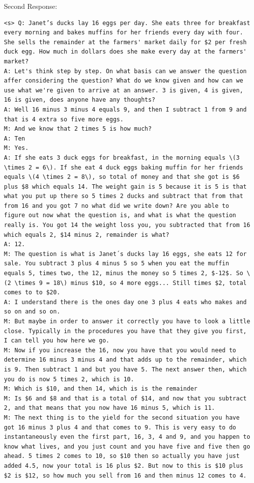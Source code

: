 \documentclass{article} %
\begin{document}
\vspace{10px}
Second Response:
\begin{lstlisting}
<s> Q: Janet’s ducks lay 16 eggs per day. She eats three for breakfast every morning and bakes muffins for her friends every day with four. She sells the remainder at the farmers' market daily for $2 per fresh duck egg. How much in dollars does she make every day at the farmers' market?
A: Let's think step by step. On what basis can we answer the question affer considering the question? What do we know given and how can we use what we're given to arrive at an answer. 3 is given, 4 is given, 16 is given, does anyone have any thoughts?
A: Well 16 minus 3 minus 4 equals 9, and then I subtract 1 from 9 and that is 4 extra so five more eggs.
M: And we know that 2 times 5 is how much?
A: Ten
M: Yes.
A: If she eats 3 duck eggs for breakfast, in the morning equals \(3 \times 2 = 6\). If she eat 4 duck eggs baking muffin for her friends equals \(4 \times 2 = 8\), so total of money and that she got is $6 plus $8 which equals 14. The weight gain is 5 because it is 5 is that what you put up there so 5 times 2 ducks and subtract that from that from 16 and you got 7 no what did we write down? Are you able to figure out now what the question is, and what is what the question really is. You got 14 the weight loss you, you subtracted that from 16 which equals 2, $14 minus 2, remainder is what?
A: 12.
M: The question is what is Janet´s ducks lay 16 eggs, she eats 12 for sale. You subtract 3 plus 4 minus 5 so 5 when you eat the muffin equals 5, times two, the 12, minus the money so 5 times 2, $-12$. So \(2 \times 9 = 18\) minus $10, so 4 more eggs... Still times $2, total comes to to $20.
A: I understand there is the ones day one 3 plus 4 eats who makes and so on and so on.
M: But maybe in order to answer it correctly you have to look a little close. Typically in the procedures you have that they give you first, I can tell you how here we go.
M: Now if you increase the 16, now you have that you would need to determine 16 minus 3 minus 4 and that adds up to the remainder, which is 9. Then subtract 1 and but you have 5. The next answer then, which you do is now 5 times 2, which is 10.
M: Which is $10, and then 14, which is is the remainder
M: Is $6 and $8 and that is a total of $14, and now that you subtract 2, and that means that you now have 16 minus 5, which is 11.
M: The next thing is to the yield for the second situation you have got 16 minus 3 plus 4 and that comes to 9. This is very easy to do instantaneously even the first part, 16, 3, 4 and 9, and you happen to know what lives, and you just count and you have five and five then go ahead. 5 times 2 comes to 10, so $10 then so actually you have just added 4.5, now your total is 16 plus $2. But now to this is $10 plus $2 is $12, so how much you sell from 16 and then minus 12 comes to 4.

\end{lstlisting}
\end{document}
